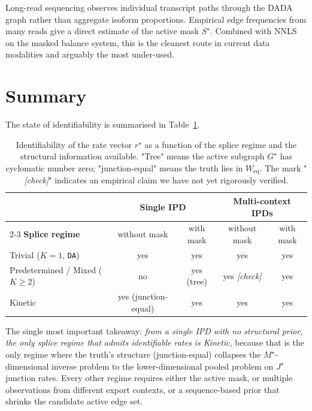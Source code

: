 \documentclass[11pt, a4paper]{article}
\newcommand{\note}[1]{\textcolor{red!70!black}{\textit{[#1]}}}
\newcommand{\rstar}{r^{\star}}
\newcommand{\Sstar}{S^{\star}}
\newcommand{\Gstar}{G^{\star}}
\begin{document}
Long-read sequencing observes individual transcript paths through the DADA graph rather than aggregate isoform proportions. Empirical edge frequencies from many reads give a direct estimate of the active mask $\Sstar$. Combined with NNLS on the masked balance system, this is the cleanest route in current data modalities and arguably the most under-used.

\section{Summary}

The state of identifiability is summarised in Table~\ref{tab:summary}.

\begin{table}[h]
\centering
\renewcommand{\arraystretch}{1.3}
\begin{tabular}{lcccc}
\toprule
& \multicolumn{2}{c}{\textbf{Single IPD}} & \multicolumn{2}{c}{\textbf{Multi-context IPDs}} \\
\cline{2-3} \cline{4-5}
\textbf{Splice regime} & without mask & with mask & without mask & with mask \\
\midrule
Trivial ($K = 1$, \texttt{DA}) & yes & yes & yes & yes \\
Predetermined / Mixed ($K \geq 2$) & no & yes (tree) & yes \note{check} & yes \\
Kinetic & yes (junction-equal) & yes & yes & yes \\
\bottomrule
\end{tabular}
\caption{Identifiability of the rate vector $\rstar$ as a function of the splice regime and the structural information available. "Tree" means the active subgraph $\Gstar$ has cyclomatic number zero; "junction-equal" means the truth lies in $W_{\mathrm{eq}}$. The mark "\note{check}" indicates an empirical claim we have not yet rigorously verified.}
\label{tab:summary}
\end{table}

The single most important takeaway: \emph{from a single IPD with no structural prior, the only splice regime that admits identifiable rates is Kinetic}, because that is the only regime where the truth's structure (junction-equal) collapses the $M^{\star}$-dimensional inverse problem to the lower-dimensional pooled problem on $J^{\star}$ junction rates. Every other regime requires either the active mask, or multiple observations from different export contexts, or a sequence-based prior that shrinks the candidate active edge set.
\end{document}
